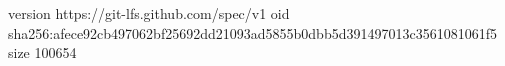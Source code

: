 version https://git-lfs.github.com/spec/v1
oid sha256:afece92cb497062bf25692dd21093ad5855b0dbb5d391497013c3561081061f5
size 100654
